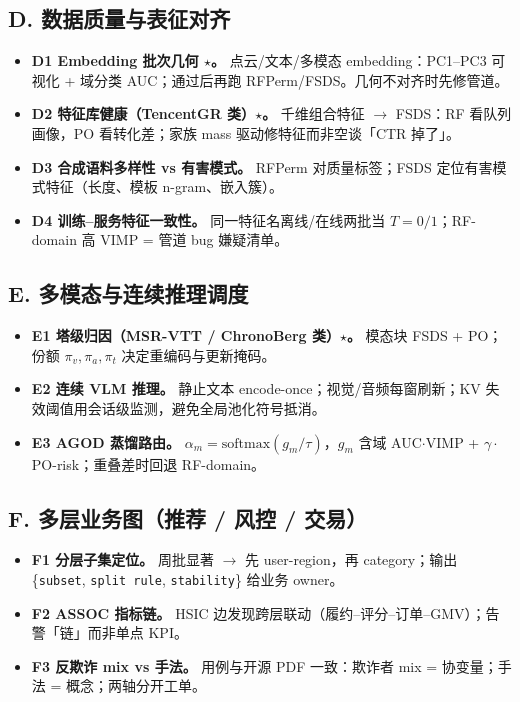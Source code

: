 \documentclass[11pt,a4paper,UTF8,fontset=none]{ctexart}
\begin{document}
\subsection{D. 数据质量与表征对齐}
\begin{itemize}
  \item \textbf{D1 Embedding 批次几何 \(\star\)。} 点云/文本/多模态 embedding：PC1--PC3 可视化 + 域分类 AUC；通过后再跑 RFPerm/FSDS。几何不对齐时先修管道。
  \item \textbf{D2 特征库健康（TencentGR 类）\(\star\)。} 千维组合特征 \(\to\) FSDS：RF 看队列画像，PO 看转化差；家族 mass 驱动修特征而非空谈「CTR 掉了」。
  \item \textbf{D3 合成语料多样性 vs 有害模式。} RFPerm 对质量标签；FSDS 定位有害模式特征（长度、模板 n-gram、嵌入簇）。
  \item \textbf{D4 训练--服务特征一致性。} 同一特征名离线/在线两批当 \(T=0/1\)；RF-domain 高 VIMP = 管道 bug 嫌疑清单。
\end{itemize}

\subsection{E. 多模态与连续推理调度}
\begin{itemize}
  \item \textbf{E1 塔级归因（MSR-VTT / ChronoBerg 类）\(\star\)。} 模态块 FSDS + PO；份额 \(\pi_v,\pi_a,\pi_t\) 决定重编码与更新掩码。
  \item \textbf{E2 连续 VLM 推理。} 静止文本 encode-once；视觉/音频每窗刷新；KV 失效阈值用会话级监测，避免全局池化符号抵消。
  \item \textbf{E3 AGOD 蒸馏路由。} \(\alpha_m=\mathrm{softmax}(g_m/\tau)\)，\(g_m\) 含域 AUC\(\cdot\)VIMP + \(\gamma\cdot\)PO-risk；重叠差时回退 RF-domain。
\end{itemize}

\subsection{F. 多层业务图（推荐 / 风控 / 交易）}
\begin{itemize}
  \item \textbf{F1 分层子集定位。} 周批显著 \(\to\) 先 user-region，再 category；输出 \{\texttt{subset}, \texttt{split rule}, \texttt{stability}\} 给业务 owner。
  \item \textbf{F2 ASSOC 指标链。} HSIC 边发现跨层联动（履约--评分--订单--GMV）；告警「链」而非单点 KPI。
  \item \textbf{F3 反欺诈 mix vs 手法。} 用例与开源 PDF 一致：欺诈者 mix = 协变量；手法 = 概念；两轴分开工单。
\end{itemize}
\end{document}
